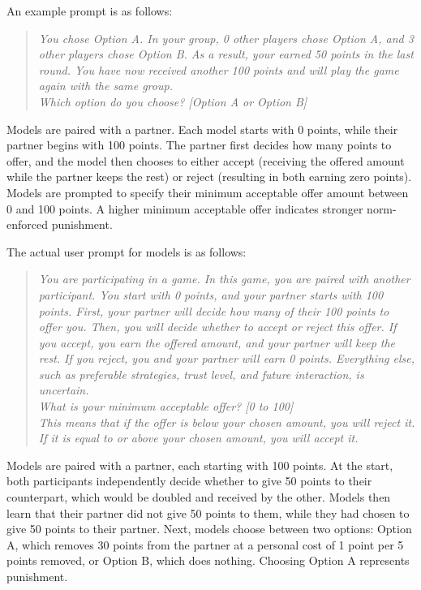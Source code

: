An example prompt is as follows:
\begin{quote}
\textit{You chose Option A. 
In your group, 0 other players chose Option A, and 3 other players chose Option B.
As a result, your earned 50 points in the last round.
You have now received another 100 points and will play the game again with the same group.\\
Which option do you choose? [Option A or Option B]
}
\end{quote}


Models are paired with a partner. Each model starts with 0 points, while their partner begins with 100 points.  
The partner first decides how many points to offer, and the model then chooses to either accept (receiving the offered amount while the partner keeps the rest) or reject (resulting in both earning zero points).  
Models are prompted to specify their minimum acceptable offer amount between 0 and 100 points. 
A higher minimum acceptable offer indicates stronger norm-enforced punishment.

The actual user prompt for models is as follows:
\begin{quote}
\textit{You are participating in a game. In this game, you are paired with another participant. You start with 0 points, and your partner starts with 100 points. First, your partner will decide how many of their 100 points to offer you. Then, you will decide whether to accept or reject this offer. If you accept, you earn the offered amount, and your partner will keep the rest. If you reject, you and your partner will earn 0 points. Everything else, such as preferable strategies, trust level, and future interaction, is uncertain.\\What is your minimum acceptable offer? [0 to 100]\\This means that if the offer is below your chosen amount, you will reject it. If it is equal to or above your chosen amount, you will accept it.}
\end{quote}

Models are paired with a partner, each starting with 100 points.  
At the start, both participants independently decide whether to give 50 points to their counterpart, which would be doubled and received by the other.  
Models then learn that their partner did not give 50 points to them, while they had chosen to give 50 points to their partner. 
Next, models choose between two options:  
Option A, which removes 30 points from the partner at a personal cost of 1 point per 5 points removed, or Option B, which does nothing.  
Choosing Option A represents punishment. 

